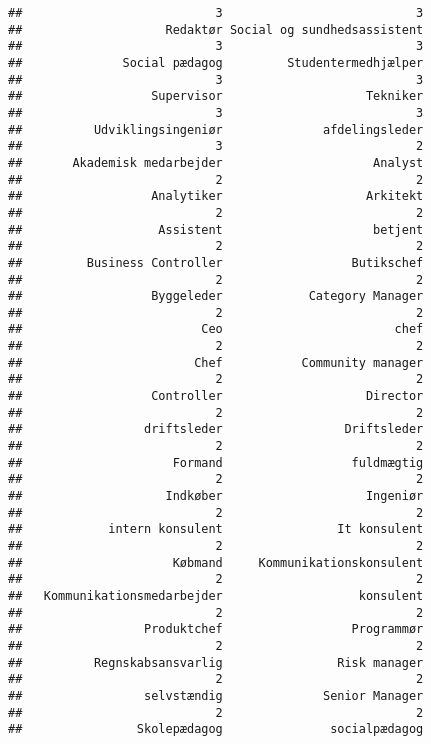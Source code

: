 \documentclass[]{article}
\begin{document}
\begin{verbatim}
##                           3                           3 
##                    Redaktør Social og sundhedsassistent 
##                           3                           3 
##              Social pædagog         Studentermedhjælper 
##                           3                           3 
##                  Supervisor                    Tekniker 
##                           3                           3 
##          Udviklingsingeniør              afdelingsleder 
##                           3                           2 
##       Akademisk medarbejder                     Analyst 
##                           2                           2 
##                  Analytiker                    Arkitekt 
##                           2                           2 
##                   Assistent                     betjent 
##                           2                           2 
##         Business Controller                  Butikschef 
##                           2                           2 
##                  Byggeleder            Category Manager 
##                           2                           2 
##                         Ceo                        chef 
##                           2                           2 
##                        Chef           Community manager 
##                           2                           2 
##                  Controller                    Director 
##                           2                           2 
##                 driftsleder                 Driftsleder 
##                           2                           2 
##                     Formand                  fuldmægtig 
##                           2                           2 
##                    Indkøber                    Ingeniør 
##                           2                           2 
##            intern konsulent                It konsulent 
##                           2                           2 
##                     Købmand     Kommunikationskonsulent 
##                           2                           2 
##   Kommunikationsmedarbejder                   konsulent 
##                           2                           2 
##                 Produktchef                  Programmør 
##                           2                           2 
##          Regnskabsansvarlig                Risk manager 
##                           2                           2 
##                 selvstændig              Senior Manager 
##                           2                           2 
##                Skolepædagog               socialpædagog 

\end{verbatim}
\end{document}
